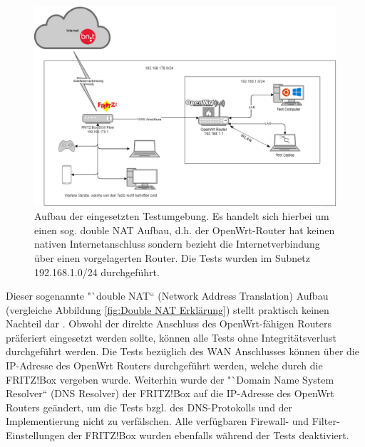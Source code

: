 \documentclass[a4paper]{book}
\begin{document}
\begin{large}
\begin{onehalfspace}
\begin{figure}[ht]
\begin{center}
\includegraphics[scale=0.45]{images/testumgebung.png} 
\caption{Aufbau der eingesetzten Testumgebung. Es handelt sich hierbei um einen sog. \glqq double NAT\grqq{} Aufbau, d.h. der OpenWrt-Router hat keinen nativen Internetanschluss sondern bezieht die Internetverbindung über einen vorgelagerten Router. Die Tests wurden im Subnetz 192.168.1.0/24 durchgeführt.}
\label{fig:Testumgebung TR}
\end{center}
\end{figure}

\indent Dieser sogenannte "`double NAT“ (Network Address Translation) Aufbau (vergleiche Abbildung \ref{fig:Double NAT Erklärung}) stellt praktisch keinen Nachteil dar \cite{OpenWrtWebseite.07.12.2020}. Obwohl der direkte Anschluss des OpenWrt-fähigen Routers präferiert eingesetzt werden sollte, können alle Tests ohne Integritätsverlust durchgeführt werden. Die Tests bezüglich des WAN Anschlusses können über die IP-Adresse des OpenWrt Routers durchgeführt werden, welche durch die FRITZ!Box vergeben wurde. Weiterhin wurde der "`Domain Name System Resolver“ (DNS Resolver) der FRITZ!Box auf die IP-Adresse des OpenWrt Routers geändert, um die Tests bzgl. des DNS-Protokolls und der Implementierung nicht zu verfälschen. Alle verfügbaren Firewall- und Filter-Einstellungen der FRITZ!Box wurden ebenfalls während der Tests deaktiviert. 



\end{onehalfspace}
\end{large}
\end{document}
